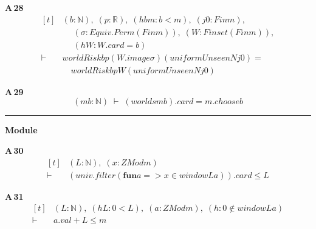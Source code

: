 \noindent\textbf{A\,28}\quad{}
{\footnotesize\[ \begin{aligned}[t]
&(\mathit{b} : \mathbb{N} ),\; (\mathit{p} : \mathbb{R} ),\; (\mathit{hbm} : \mathit{b} < \mathit{m}),\; (\mathit{j0} : \mathit{Fin} \mathit{m}),\\
&\quad \; (\sigma : \mathit{Equiv}.\mathit{Perm} (\mathit{Fin} \mathit{m})),\; (\mathit{W} : \mathit{Finset} (\mathit{Fin} \mathit{m})),\\
&\quad \; (\mathit{hW} : \mathit{W}.\mathit{card} = \mathit{b})\\
\vdash\;&\mathit{worldRisk} \mathit{b} \mathit{p} (\mathit{W}.\mathit{image} \sigma ) (\mathit{uniformUnseen} \mathit{N} \mathit{j0}) =\\
&\quad \mathit{worldRisk} \mathit{b} \mathit{p} \mathit{W} (\mathit{uniformUnseen} \mathit{N} \mathit{j0})
\end{aligned} \]}

\noindent\textbf{A\,29}\quad{}
{\footnotesize\[ (\mathit{m} \mathit{b} : \mathbb{N} ) \;\vdash\; (\mathit{worlds} \mathit{m} \mathit{b}).\mathit{card} = \mathit{m}.\mathit{choose} \mathit{b} \]}

\vspace{4pt}\noindent\rule{\columnwidth}{0.4pt}\par\vspace{2pt}
\noindent\textbf{Module }\par\vspace{3pt}

\noindent\textbf{A\,30}\quad{}
{\footnotesize\[ \begin{aligned}[t]
&(\mathit{L} : \mathbb{N} ),\; (\mathit{x} : \mathit{ZMod} \mathit{m})\\
\vdash\;&(\mathit{univ}.\mathit{filter} (\mathbf{fun} \mathit{a} => \mathit{x} \in \mathit{window} \mathit{L} \mathit{a})).\mathit{card} \leq \mathit{L}
\end{aligned} \]}

\noindent\textbf{A\,31}\quad{}
{\footnotesize\[ \begin{aligned}[t]
&(\mathit{L} : \mathbb{N} ),\; (\mathit{hL} : 0<\mathit{L}),\; (\mathit{a} : \mathit{ZMod} \mathit{m}),\; (\mathit{h} : 0 \notin \mathit{window} \mathit{L} \mathit{a})\\
\vdash\;&\mathit{a}.\mathit{val}+\mathit{L} \leq \mathit{m}
\end{aligned} \]}

